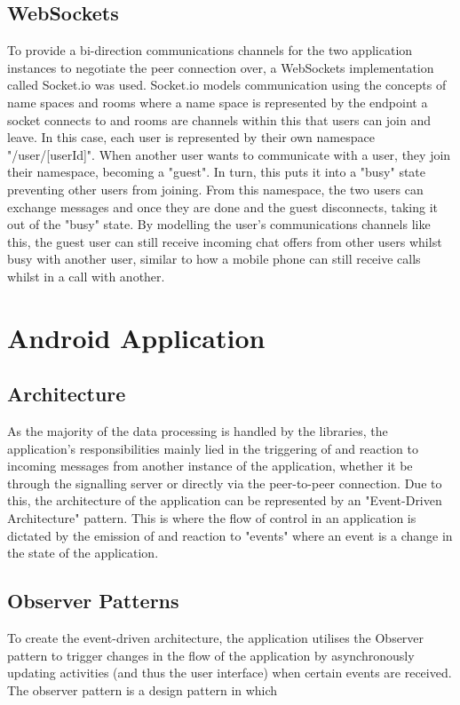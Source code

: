 \documentclass[]{report}
\begin{document}
			\subsection{WebSockets}
			To provide a bi-direction communications channels for the two application instances to negotiate the peer connection over, a WebSockets implementation called Socket.io was used. Socket.io models communication using the concepts of name spaces and rooms where a name space is represented by the endpoint a socket connects to and rooms are channels within this that users can join and leave. In this case, each user is represented by their own namespace "/user/[userId]". When another user wants to communicate with a user, they join their namespace, becoming a "guest". In turn, this puts it into a "busy" state preventing other users from joining. From this namespace, the two users can exchange messages and once they are done and the guest disconnects, taking it out of the "busy" state. By modelling the user's communications channels like this, the guest user can still receive incoming chat offers from other users whilst busy with another user, similar to how a mobile phone can still receive calls whilst in a call with another. 
			
		\section{Android Application}
			
			\subsection{Architecture}
			As the majority of the data processing is handled by the libraries, the application's responsibilities mainly lied in the triggering of and reaction to incoming messages from another instance of the application, whether it be through the signalling server or directly via the peer-to-peer connection. Due to this, the architecture of the application can be represented by an "Event-Driven Architecture" pattern. This is where the flow of control in an application is dictated by the emission of and reaction to "events" where an event is a change in the state of the application. 
			
			\subsection{Observer Patterns}
			To create the event-driven architecture, the application utilises the Observer pattern to trigger changes in the flow of the application by asynchronously updating activities (and thus the user interface) when certain events are received. The observer pattern is a design pattern in which 
			
\end{document}
